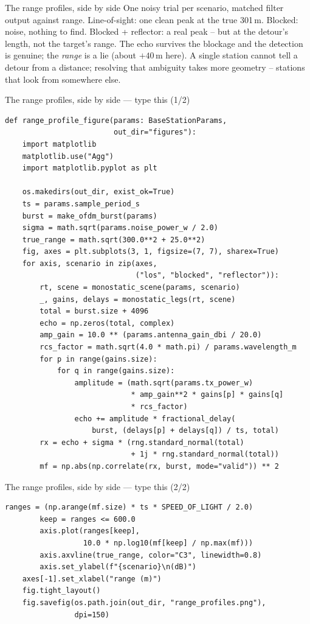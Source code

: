 \documentclass[10pt]{beamer}
\begin{document}
\begin{frame}{The range profiles, side by side}
  One noisy trial per scenario, matched filter output
  against range. Line-of-sight: one clean peak at the true
  301\,m. Blocked: noise, nothing to find. Blocked +
  reflector: a real peak -- but at the detour's length, not
  the target's range. The echo survives the blockage and
  the detection is genuine; the \emph{range} is a lie
  (about $+40$\,m here). A single station cannot tell a
  detour from a distance; resolving that ambiguity takes
  more geometry -- stations that look from somewhere else.
\end{frame}

\begin{frame}[fragile]{The range profiles, side by side --- type this (1/2)}
\begin{lstlisting}[basicstyle=\ttfamily\tiny]
def range_profile_figure(params: BaseStationParams,
                         out_dir="figures"):
    import matplotlib
    matplotlib.use("Agg")
    import matplotlib.pyplot as plt

    os.makedirs(out_dir, exist_ok=True)
    ts = params.sample_period_s
    burst = make_ofdm_burst(params)
    sigma = math.sqrt(params.noise_power_w / 2.0)
    true_range = math.sqrt(300.0**2 + 25.0**2)
    fig, axes = plt.subplots(3, 1, figsize=(7, 7), sharex=True)
    for axis, scenario in zip(axes,
                              ("los", "blocked", "reflector")):
        rt, scene = monostatic_scene(params, scenario)
        _, gains, delays = monostatic_legs(rt, scene)
        total = burst.size + 4096
        echo = np.zeros(total, complex)
        amp_gain = 10.0 ** (params.antenna_gain_dbi / 20.0)
        rcs_factor = math.sqrt(4.0 * math.pi) / params.wavelength_m
        for p in range(gains.size):
            for q in range(gains.size):
                amplitude = (math.sqrt(params.tx_power_w)
                             * amp_gain**2 * gains[p] * gains[q]
                             * rcs_factor)
                echo += amplitude * fractional_delay(
                    burst, (delays[p] + delays[q]) / ts, total)
        rx = echo + sigma * (rng.standard_normal(total)
                             + 1j * rng.standard_normal(total))
        mf = np.abs(np.correlate(rx, burst, mode="valid")) ** 2
\end{lstlisting}
\end{frame}

\begin{frame}[fragile]{The range profiles, side by side --- type this (2/2)}
\begin{lstlisting}[basicstyle=\ttfamily\tiny]
        ranges = (np.arange(mf.size) * ts * SPEED_OF_LIGHT / 2.0)
        keep = ranges <= 600.0
        axis.plot(ranges[keep],
                  10.0 * np.log10(mf[keep] / np.max(mf)))
        axis.axvline(true_range, color="C3", linewidth=0.8)
        axis.set_ylabel(f"{scenario}\n(dB)")
    axes[-1].set_xlabel("range (m)")
    fig.tight_layout()
    fig.savefig(os.path.join(out_dir, "range_profiles.png"),
                dpi=150)
\end{lstlisting}
\end{frame}
\end{document}
